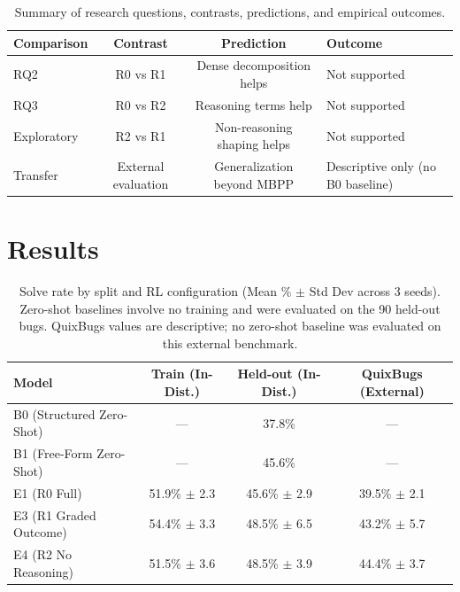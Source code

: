 \documentclass{article}
\begin{document}
\begin{table}[t]
\centering
\small
\begin{tabular}{l c c l}
\toprule
\textbf{Comparison} & \textbf{Contrast} & \textbf{Prediction} & \textbf{Outcome} \\
\midrule
RQ2 & R0 vs R1 & Dense decomposition helps & Not supported \\
RQ3 & R0 vs R2 & Reasoning terms help & Not supported \\
Exploratory & R2 vs R1 & Non-reasoning shaping helps & Not supported \\
Transfer & External evaluation & Generalization beyond MBPP & Descriptive only (no B0 baseline) \\
\bottomrule
\end{tabular}
\caption{Summary of research questions, contrasts, predictions, and empirical outcomes.}
\label{tab:hypotheses}
\end{table}

\section{Results}

\begin{table}[h]
\centering
\small
\begin{tabular}{l c c c}
\toprule
\textbf{Model} & \textbf{Train (In-Dist.)} & \textbf{Held-out (In-Dist.)} & \textbf{QuixBugs (External)} \\
\midrule
B0 (Structured Zero-Shot) & --- & 37.8\% & --- \\
B1 (Free-Form Zero-Shot)   & --- & 45.6\% & --- \\
E1 (R0 Full)              & 51.9\% $\pm$ 2.3 & 45.6\% $\pm$ 2.9 & 39.5\% $\pm$ 2.1 \\
E3 (R1 Graded Outcome)     & 54.4\% $\pm$ 3.3 & 48.5\% $\pm$ 6.5 & 43.2\% $\pm$ 5.7 \\
E4 (R2 No Reasoning)      & 51.5\% $\pm$ 3.6 & 48.5\% $\pm$ 3.9 & 44.4\% $\pm$ 3.7 \\
\bottomrule
\end{tabular}
\caption{Solve rate by split and RL configuration (Mean \% $\pm$ Std Dev across 3 seeds). Zero-shot baselines involve no training and were evaluated on the 90 held-out bugs. QuixBugs values are descriptive; no zero-shot baseline was evaluated on this external benchmark.}
\label{tab:results}
\end{table}
\end{document}
